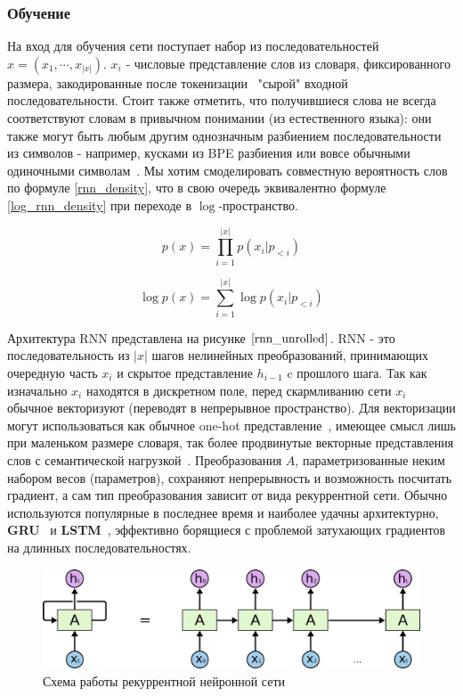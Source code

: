 \documentclass{spbau-diploma}
\begin{document}
\subsubsection{Обучение}
На вход для обучения сети поступает набор из последовательностей 
$x = (x_1, \cdots, x_{|x|})$. $x_i$ - числовые представление слов из словаря,
фиксированного размера, закодированные 
после токенизации~\cite{wiki:token} "сырой" входной последовательности. Стоит
также отметить, что получившиеся слова не всегда соответствуют словам в 
привычном понимании (из естественного языка): они также могут быть любым другим
однозначным разбиением последовательности из символов - например, кусками из BPE
разбиения или вовсе обычными одиночными символам~\cite{1508.07909, charnn}. Мы 
хотим смоделировать совместную вероятность слов по формуле \ref{rnn_density}, 
что в свою очередь эквивалентно формуле \ref{log_rnn_density} при переходе в 
$\log$-пространство.

\begin{equation}
\label{rnn_density}
p(x) = \prod^{|x|}_{i=1}{p(x_i | p_{<i})}
\end{equation}

\begin{equation}
\label{log_rnn_density}
\log p(x) = \sum\limits^{|x|}_{i=1}{\log p(x_i | p_{<i})}
\end{equation}

Архитектура RNN представлена на рисунке $\ref{rnn_unrolled}$. RNN - это 
последовательность из $|x|$ шагов нелинейных преобразований, принимающих 
очередную часть $x_i$ и скрытое представление $h_{i-1}$ c прошлого шага. Так как
изначально $x_i$ находятся в дискретном поле, перед скармливанию сети $x_i$ 
обычное векторизуют (переводят в непрерывное пространство). Для векторизации 
могут использоваться как обычное one-hot представление~\cite{onehot}, имеющее
смысл лишь при маленьком размере словаря, так более продвинутые векторные 
представления слов с семантической нагрузкой~\cite{word2vec, glove, elmo}. 
Преобразования $A$, параметризованные неким набором весов (параметров), 
сохраняют непрерывность и возможность посчитать градиент, 
а сам тип преобразования зависит от вида рекуррентной сети.
Обычно используются популярные в последнее 
время и наиболее удачны архитектурно, \textbf{GRU}~\cite{1412.3555} и 
\textbf{LSTM}~\cite{lstm}, эффективно борящиеся с проблемой затухающих 
градиентов на длинных последовательностях.

\begin{figure}[H]
\centering
\includegraphics[width=\textwidth]{images/rnn_unrolled.png}
\caption{Схема работы рекуррентной нейронной сети~\cite{medium:rnn}}
\label{rnn_unrolled}
\end{figure}
\end{document}
